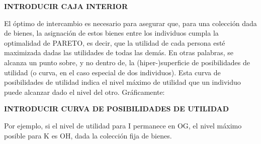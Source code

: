 \documentclass[10pt,a4paper]{article}
\begin{document}
\textbf{INTRODUCIR CAJA INTERIOR}

El óptimo de intercambio es necesario para asegurar que, para una colección dada de bienes, la asignación de estos bienes entre los individuos cumpla la optimalidad de PARETO, es decir, que la utilidad de cada persona esté maximizada dadas las utilidades de todas las demás. En otras palabras, se alcanza un punto sobre, y no dentro de, la (hiper-)superficie de posibilidades de utilidad (o curva, en el caso especial de dos individuos). Esta curva de posibilidades de utilidad indica el nivel máximo de utilidad que un individuo puede alcanzar dado el nivel del otro. Gráficamente:

\textbf{INTRODUCIR CURVA DE POSIBILIDADES DE UTILIDAD}

Por ejemplo, si el nivel de utilidad para I permanece en OG, el nivel máximo posible para K es OH, dada la colección fija de bienes.
\end{document}
